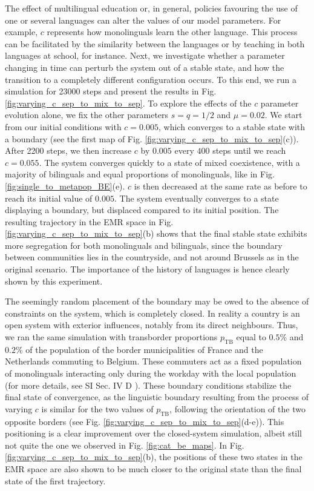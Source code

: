 \documentclass[../thesis.tex]{subfiles}
\begin{document}
The effect of multilingual education or, in general, policies favouring the use of one or
several languages can alter the values of our model parameters. For example, $c$
represents how monolinguals learn the other language. This process can be facilitated by
the similarity between the languages or by teaching in both languages at school, for
instance. Next, we investigate whether a parameter changing in time can perturb the
system out of a stable state, and how the transition to a completely different
configuration occurs. To this end, we run a simulation for 23000 steps and present the
results in Fig. \cref{fig:varying_c_sep_to_mix_to_sep}. To explore the effects of the $c$
parameter evolution alone, we fix the other parameters $s = q = 1/2$ and $\mu = 0.02$.
We start from our initial conditions with $c = 0.005$, which converges to a stable state
with a boundary (see the first map of Fig.
\cref{fig:varying_c_sep_to_mix_to_sep}(c)). After 2200 steps, we then increase $c$
by $0.005$ every $400$ steps until we reach $c = 0.055$. The system converges quickly to
a state of mixed coexistence, with a majority of bilinguals and equal proportions of
monolinguals, like in Fig. \cref{fig:single_to_metapop_BE}(e). $c$ is then
decreased at the same rate as before to reach its initial value of $0.005$. The system
eventually converges to a state displaying a boundary, but displaced compared to its
initial position. The
resulting trajectory in the \ac{EMR} space in Fig.
\cref{fig:varying_c_sep_to_mix_to_sep}(b) shows that the final stable state
exhibits more segregation for both monolinguals and bilinguals, since the boundary
between communities lies in the countryside, and not around Brussels as in the original
scenario. The importance of the history of languages is hence clearly shown by this
experiment.

The seemingly random placement of the boundary may be owed to the absence of constraints
on the system, which is completely closed. In reality a country is an open system with
exterior influences, notably from its direct neighbours. Thus, we ran the same simulation
with transborder proportions $p_{\text{TB}}$ equal to $0.5\%$ and $0.2\%$ of the
population of the border municipalities of France and the Netherlands commuting to
Belgium. These commuters act as a fixed population of monolinguals interacting only
during the workday with the local population (for more details, see SI Sec. IV D
\cite{supp}). These boundary conditions stabilize the final state of convergence, as the
linguistic boundary resulting from the process of varying $c$ is similar for the two
values of $p_{\text{TB}}$, following the orientation of the two opposite borders (see
Fig. \cref{fig:varying_c_sep_to_mix_to_sep}(d-e)). This positioning is a
clear improvement over the closed-system simulation, albeit still not quite the one we
observed in Fig. \cref{fig:cat_be_maps}. In Fig.
\cref{fig:varying_c_sep_to_mix_to_sep}(b), the positions of these two states in
the \ac{EMR} space are also shown to be much closer to the original state than the final
state of the first trajectory.
\end{document}
